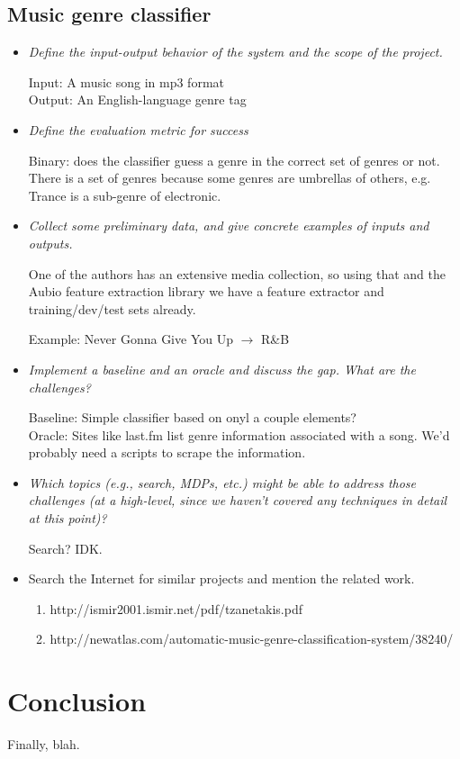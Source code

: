 \documentclass[12pt]{article}
\begin{document}
\subsection{Music genre classifier}
\begin{itemize}
  \item  \emph{Define the input-output behavior of the system and the scope of the project.}

    Input: A music song in mp3 format\\
    Output: An English-language genre tag

  \item  \emph{Define the evaluation metric for success}
    
    Binary: does the classifier guess a genre in the correct set of
    genres or not. There is a set of genres because some genres are
    umbrellas of others, e.g. Trance is a sub-genre of electronic.

  \item  \emph{Collect some preliminary data, and give concrete examples of inputs and outputs.}

    One of the authors has an extensive media collection, so using
    that and the Aubio feature extraction library we have a feature
    extractor and training/dev/test sets already.

    Example: Never Gonna Give You Up $\rightarrow$ R\&B
    
  \item \emph{Implement a baseline and an oracle and discuss the gap. What are the challenges?}

    Baseline: Simple classifier based on onyl a couple elements?\\
    Oracle: Sites like last.fm list genre information associated with a song. We'd probably need a scripts to scrape the information. 
    
  \item \emph{Which topics (e.g., search, MDPs, etc.) might be able to address those challenges (at a high-level, since we haven't covered any techniques in detail at this point)?}

    Search? IDK.
    
  \item  Search the Internet for similar projects and mention the related work.
    \begin{enumerate}
      \item http://ismir2001.ismir.net/pdf/tzanetakis.pdf
      \item http://newatlas.com/automatic-music-genre-classification-system/38240/
    \end{enumerate}
    
\end{itemize}
\section*{Conclusion}

Finally, blah.
\end{document}
